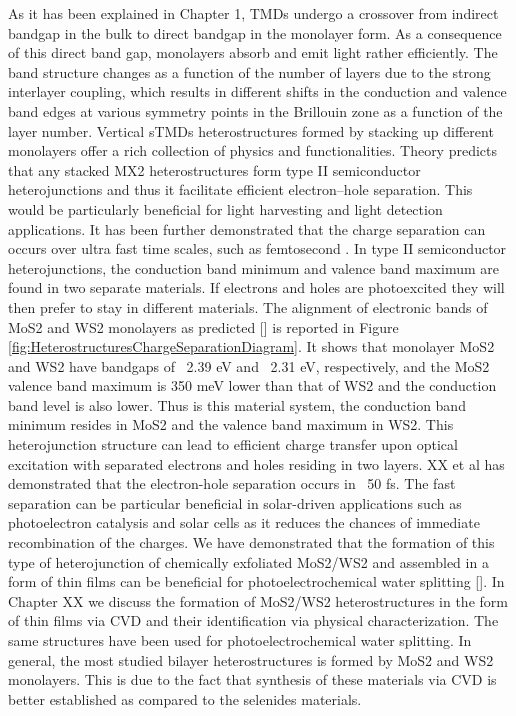 As it has been explained in Chapter 1, TMDs undergo a crossover from indirect bandgap in the bulk to direct bandgap in the monolayer form. As a consequence of this direct band gap, monolayers absorb and emit light rather efficiently. The band structure changes as a function of the number of layers due to the strong interlayer coupling, which results in different shifts in the conduction and valence band edges at various symmetry points in the Brillouin zone as a function of the layer number.  Vertical sTMDs heterostructures formed by stacking up different monolayers offer a rich collection of physics and functionalities. Theory predicts that any stacked MX2 heterostructures form type II semiconductor heterojunctions and thus it facilitate efficient electron–hole separation. This would be particularly beneficial for light harvesting and light detection applications. It has been further demonstrated that the charge separation can occurs over ultra fast time scales, such as femtosecond \cite{Hong2014}.
In type II semiconductor heterojunctions, the conduction band minimum and valence band maximum are found in two separate materials. If electrons and holes are photoexcited they will then prefer to stay in different materials. The alignment of electronic bands of MoS2 and WS2 monolayers as predicted [] is reported in Figure \ref{fig:HeterostructuresChargeSeparationDiagram}. It shows that monolayer MoS2 and WS2 have bandgaps of ~2.39 eV and ~2.31 eV, respectively, and the MoS2 valence band maximum is 350 meV lower than that of WS2 and the conduction band level is also lower.  Thus is this material system, the conduction band minimum resides in MoS2 and the valence band maximum in WS2. This heterojunction structure can lead to efficient charge transfer upon optical excitation with separated electrons and holes residing in two layers. XX et al has demonstrated that the electron-hole separation occurs in ~50 fs. The fast separation can be particular beneficial in solar-driven applications such as photoelectron catalysis and solar cells as it reduces the chances of immediate recombination of the charges.
We have demonstrated that the formation of this type of heterojunction of chemically exfoliated MoS2/WS2 and assembled in a form of thin films can be beneficial for photoelectrochemical water splitting []. In Chapter XX we discuss the formation of MoS2/WS2 heterostructures in the form of thin films via CVD and their identification via physical characterization. The same structures have been used for photoelectrochemical water splitting. In general, the most studied bilayer heterostructures is formed by MoS2 and WS2 monolayers. This is due to the fact that synthesis of these materials via CVD is better established as compared to the selenides materials. 

